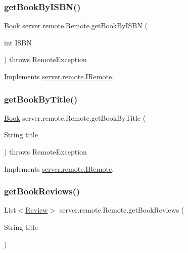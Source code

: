 \subsubsection{\texorpdfstring{get\+Book\+By\+I\+S\+B\+N()}{getBookByISBN()}}
{\footnotesize\ttfamily \hyperlink{classserver_1_1data_1_1_book}{Book} server.\+remote.\+Remote.\+get\+Book\+By\+I\+S\+BN (\begin{DoxyParamCaption}\item[{int}]{I\+S\+BN }\end{DoxyParamCaption}) throws Remote\+Exception}



Implements \hyperlink{interfaceserver_1_1remote_1_1_i_remote_a736183bf7a57f78acf11fb78ae0f0e58}{server.\+remote.\+I\+Remote}.

\mbox{\label{classserver_1_1remote_1_1_remote_a560427fc017e15f04e12bd880e6f086e}} 
\subsubsection{\texorpdfstring{get\+Book\+By\+Title()}{getBookByTitle()}}
{\footnotesize\ttfamily \hyperlink{classserver_1_1data_1_1_book}{Book} server.\+remote.\+Remote.\+get\+Book\+By\+Title (\begin{DoxyParamCaption}\item[{String}]{title }\end{DoxyParamCaption}) throws Remote\+Exception}



Implements \hyperlink{interfaceserver_1_1remote_1_1_i_remote_a520cc1af90d13264c14b32e19b5ce712}{server.\+remote.\+I\+Remote}.

\mbox{\label{classserver_1_1remote_1_1_remote_a501e5c5fe847917c9615f0772864a147}} 
\subsubsection{\texorpdfstring{get\+Book\+Reviews()}{getBookReviews()}}
{\footnotesize\ttfamily List$<$\hyperlink{classserver_1_1data_1_1_review}{Review}$>$ server.\+remote.\+Remote.\+get\+Book\+Reviews (\begin{DoxyParamCaption}\item[{String}]{title }\end{DoxyParamCaption})}



